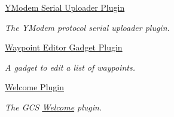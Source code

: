 \begin{DoxyCompactItemize}
\hyperlink{group___y_modem_uploader}{\-Y\-Modem Serial Uploader Plugin}
\begin{DoxyCompactList}\small\item\em \-The \-Y\-Modem protocol serial uploader plugin. \end{DoxyCompactList}\item 
\hyperlink{group___waypoint_editor_gadget_plugin}{\-Waypoint Editor Gadget Plugin}
\begin{DoxyCompactList}\small\item\em \-A gadget to edit a list of waypoints. \end{DoxyCompactList}\item 
\hyperlink{group___welcome_plugin}{\-Welcome Plugin}
\begin{DoxyCompactList}\small\item\em \-The \-G\-C\-S \hyperlink{namespace_welcome}{\-Welcome} plugin. \end{DoxyCompactList}\end{DoxyCompactItemize}
